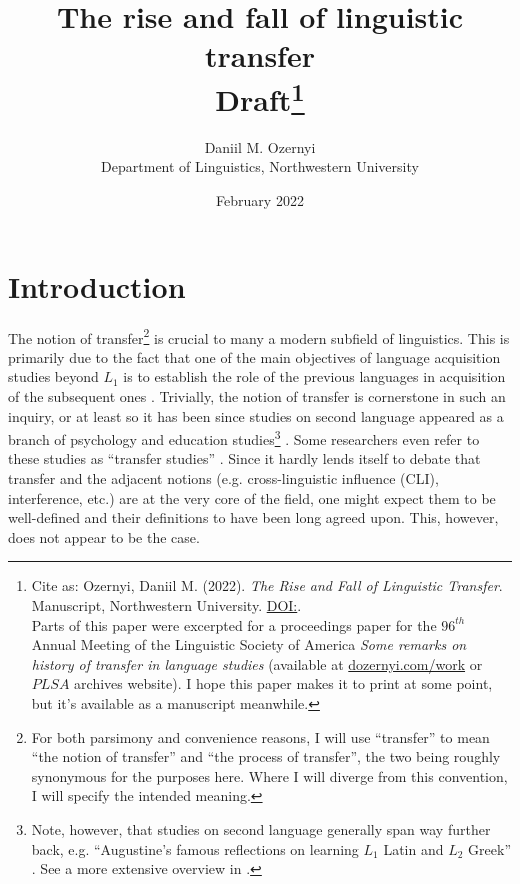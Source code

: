 \documentclass{article}
\title{The rise and fall of linguistic transfer\\
{\fontfamily{qcr}\selectfont Draft}\footnote{Cite as: Ozernyi, Daniil M. (2022). \textit{The Rise and Fall of Linguistic Transfer}. Manuscript, Northwestern University. \href{https://doi.orgxxx}{DOI:}. \\ Parts of this paper were excerpted for a proceedings paper for the $96^{th}$ Annual Meeting of the Linguistic Society of America \textit{Some remarks on history of transfer in language studies} (available at \href{https://dozernyi.com/work}{dozernyi.com/work} or $PLSA$ archives website). I hope this paper makes it to print at some point, but it's available as a manuscript meanwhile.}}
\author{Daniil M. Ozernyi\\ Department of Linguistics, Northwestern University}
\date{February 2022}
\begin{document}
\maketitle

\section{Introduction}
The notion of transfer\footnote{For both parsimony and convenience reasons, I will use ``transfer'' to mean ``the notion of transfer'' and ``the process of transfer'', the two being roughly synonymous for the purposes here. Where I will diverge from this convention, I will specify the intended meaning.} is crucial to many a modern subfield of linguistics. This is primarily due to the fact that one of the main objectives of language acquisition studies beyond \(L_1\) is to establish the role of the previous languages in acquisition of the subsequent ones \citep[cf.][]{epstein_second_1996, cenoz_beyond_1998, cenoz_cross-linguistic_2001, white_universal_2012, rothman_third_2019}. Trivially, the notion of transfer is cornerstone in such an inquiry, or at least so it has been since studies on second language appeared as a branch of psychology and education studies\footnote{Note, however, that studies on second language generally span way further back, e.g. ``Augustine's famous reflections on learning $L_1$ Latin and $L_2$ Greek'' \citep[][p. 743]{thomas_full_1996}. See a more extensive overview in \cite{thomas_medieval_1995}.} \citep[since][]{lado_linguistics_1957}. Some researchers even refer to these studies as ``transfer studies'' \citep[e.g.,][]{gass_second_1988, ringbom_importance_2006, puig-mayenco_systematic_2020, puig-mayenco_low_2020}. Since it hardly lends itself to debate that transfer and the adjacent notions (e.g. cross-linguistic influence (CLI), interference, etc.) are at the very core of the field, one might expect them to be well-defined and their definitions to have been long agreed upon. This, however, does not appear to be the case. 
\end{document}
